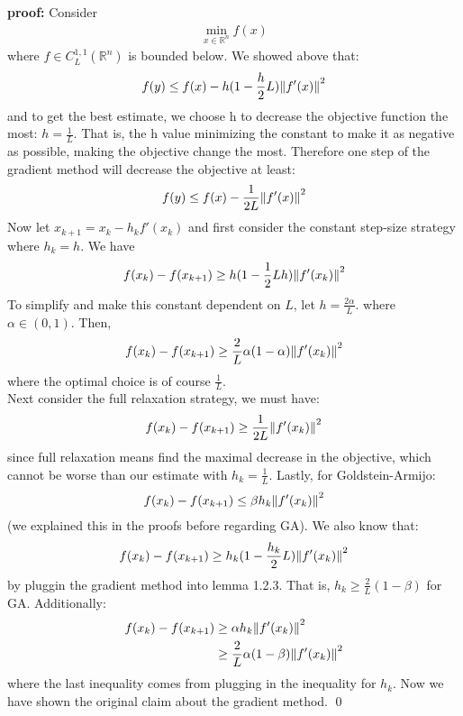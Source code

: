\documentclass[12pt,a4paper]{article}
\begin{document}
	\textbf{proof:}
	Consider 
	\begin{align*}
		\min_{x \in \mathbb{R}^n}f(x)
	\end{align*}
	where $f \in C_L^{1,1}(\mathbb{R}^n)$ is bounded below. We showed above that:
	\begin{align*}
		f(y) \leq f(x) - h(1- \frac{h}{2}L)\norm{f'(x)}^2
	\end{align*}
	and to get the best estimate, we choose h to decrease the objective function the most: $h = \frac{1}{L}$. That is, the h value minimizing the constant to make it as negative as possible, making the objective change the most. Therefore one step of the gradient method will decrease the objective at least:
	\begin{align*}
		f(y) \leq f(x) - \frac{1}{2L}\norm{f'(x)}^2
	\end{align*}
	Now let $x_{k+1} = x_k - h_kf'(x_k)$ and first consider the constant step-size strategy where $h_k = h$. We have
	\begin{align*}
		f(x_k) - f(x_{k+1}) \geq h(1 - \frac{1}{2}Lh)\norm{f'(x_k)}^2
	\end{align*}
	To simplify and make this constant dependent on $L$, let $h = \frac{2\alpha}{L}$. where $\alpha \in (0,1)$. Then,
	\begin{align*}
		f(x_k) - f(x_{k+1}) \geq \frac{2}{L}\alpha(1-\alpha)\norm{f'(x_k)}^2
	\end{align*}
	where the optimal choice is of course $\frac{1}{L}$. \\
	Next consider the full relaxation strategy, we must have:
	\begin{align*}
		f(x_k) - f(x_{k+1}) \geq \frac{1}{2L} \norm{f'(x_k)}^2
	\end{align*}
	since full relaxation means find the maximal decrease in the objective, which cannot be worse than our estimate with $h_k = \frac{1}{L}$. Lastly, for Goldstein-Armijo:
	\begin{align*}
		f(x_k) - f(x_{k+1}) \leq \beta h_k \norm{f'(x_k)}^2
	\end{align*}
	(we explained this in the proofs before regarding GA). We also know that:
	\begin{align*}
		f(x_k) - f(x_{k+1}) \geq h_k (1 - \frac{h_k}{2}L)\norm{f'(x_k)}^2
	\end{align*}
	by pluggin the gradient method into lemma 1.2.3. That is, $h_k \geq \frac{2}{L}(1-\beta)$ for GA. Additionally:
	\begin{align*}
		f(x_k) - f(x_{k+1}) &\geq \alpha h_k\norm{f'(x_k)}^2 \\
		&\geq \frac{2}{L} \alpha (1 - \beta)\norm{f'(x_k)}^2
	\end{align*}
	where the last inequality comes from plugging in the inequality for $h_k$. Now we have shown the original claim about the gradient method. \qed
	
\end{document}
